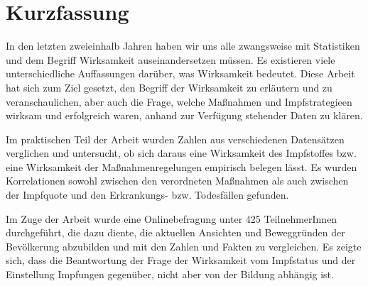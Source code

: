 \chapter{Kurzfassung}

In den letzten zweieinhalb Jahren haben wir uns alle zwangsweise mit Statistiken und dem Begriff Wirksamkeit auseinandersetzen müssen. Es existieren viele unterschiedliche Auffassungen darüber, was Wirksamkeit bedeutet. Diese Arbeit hat sich zum Ziel gesetzt, den Begriff der Wirksamkeit zu erläutern und zu veranschaulichen, aber auch die Frage, welche Maßnahmen und Impfstrategieen wirksam und erfolgreich waren, anhand zur Verfügung stehender Daten zu klären.

Im praktischen Teil der Arbeit wurden Zahlen aus verschiedenen Datensätzen verglichen und untersucht, ob sich daraus eine Wirksamkeit des Impfstoffes bzw. eine Wirksamkeit der Maßnahmenregelungen empirisch belegen lässt. Es wurden Korrelationen sowohl zwischen den verordneten Maßnahmen als auch zwischen der Impfquote und den Erkrankungs- bzw. Todesfällen gefunden.

Im Zuge der Arbeit wurde eine Onlinebefragung unter 425 TeilnehmerInnen durchgeführt, die dazu diente, die aktuellen Ansichten und Beweggründen der Bevölkerung abzubilden und mit den Zahlen und Fakten zu vergleichen. Es zeigte sich, dass die Beantwortung der Frage der Wirksamkeit vom Impfstatus und der Einstellung Impfungen gegenüber, nicht aber von der Bildung abhängig ist.
